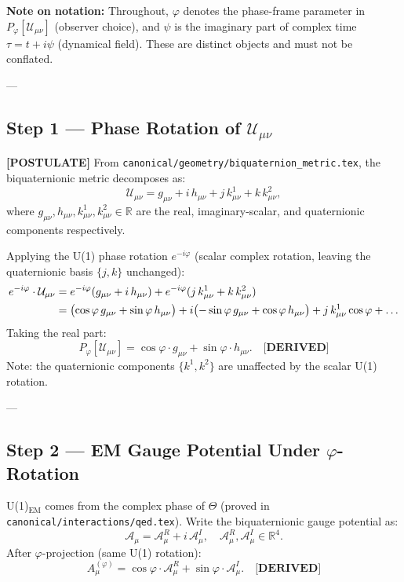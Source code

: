 \noindent \textbf{Note on notation:} Throughout, $\varphi$ denotes the phase-frame parameter in
$P_\varphi[\mathcal{U}_{\mu\nu}]$ (observer choice), and $\psi$ is the imaginary part of complex
time $\tau = t + i\psi$ (dynamical field).  These are distinct objects and must not be conflated.

---

\subsection{Step 1 — Phase Rotation of $\mathcal{U}_{\mu\nu}$}
\label{sec:phi_step1}

\textbf{[POSTULATE]} From \texttt{canonical/geometry/biquaternion\_metric.tex},
the biquaternionic metric decomposes as:
\begin{equation}
  \mathcal{U}_{\mu\nu} = g_{\mu\nu} + i\,h_{\mu\nu} + j\,k^1_{\mu\nu} + k\,k^2_{\mu\nu},
  \label{eq:biq_metric_decomp}
\end{equation}
where $g_{\mu\nu}, h_{\mu\nu}, k^1_{\mu\nu}, k^2_{\mu\nu} \in \mathbb{R}$ are the real,
imaginary-scalar, and quaternionic components respectively.

Applying the U(1) phase rotation $e^{-i\varphi}$ (scalar complex rotation,
leaving the quaternionic basis $\{j, k\}$ unchanged):
\begin{align}
  e^{-i\varphi} \cdot \mathcal{U}_{\mu\nu}
  &= e^{-i\varphi}(g_{\mu\nu} + i\,h_{\mu\nu}) + e^{-i\varphi}(j\,k^1_{\mu\nu} + k\,k^2_{\mu\nu})
  \notag\\
  &= \bigl(\cos\varphi\,g_{\mu\nu} + \sin\varphi\,h_{\mu\nu}\bigr)
   + i\bigl(-\sin\varphi\,g_{\mu\nu} + \cos\varphi\,h_{\mu\nu}\bigr)
   + j\,k^1_{\mu\nu}\cos\varphi + \ldots
\end{align}
Taking the real part:
\begin{equation}
  \boxed{P_\varphi[\mathcal{U}_{\mu\nu}]
    = \cos\varphi \cdot g_{\mu\nu} + \sin\varphi \cdot h_{\mu\nu}.}
  \label{eq:proj_result}
  \quad \textbf{[DERIVED]}
\end{equation}
Note: the quaternionic components $\{k^1, k^2\}$ are unaffected by the scalar U(1) rotation.

---

\subsection{Step 2 — EM Gauge Potential Under $\varphi$-Rotation}
\label{sec:phi_step2}

U(1)$_\mathrm{EM}$ comes from the complex phase of $\Theta$ (proved in
\texttt{canonical/interactions/qed.tex}).  Write the biquaternionic gauge potential as:
\begin{equation}
  \mathcal{A}_\mu = \mathcal{A}^R_\mu + i\,\mathcal{A}^I_\mu, \quad
  \mathcal{A}^R_\mu, \mathcal{A}^I_\mu \in \mathbb{R}^4.
\end{equation}
After $\varphi$-projection (same U(1) rotation):
\begin{equation}
  A^{(\varphi)}_\mu = \cos\varphi \cdot \mathcal{A}^R_\mu + \sin\varphi \cdot \mathcal{A}^I_\mu.
  \label{eq:A_phi}
  \quad \textbf{[DERIVED]}
\end{equation}

